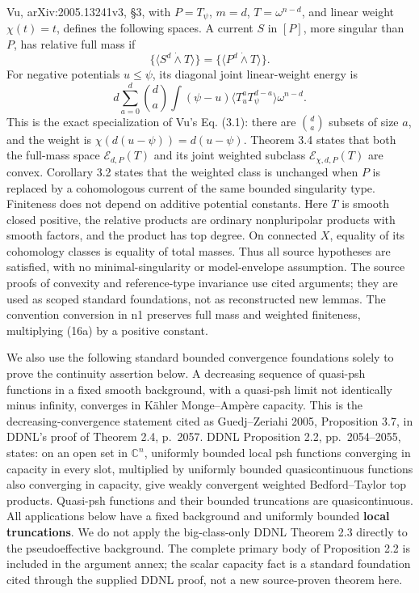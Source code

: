 \documentclass[
  11pt,
]{article}
\begin{document}
Vu, arXiv:2005.13241v3, §3, with \(P=T_\psi\), \(m=d\),
\(T=\omega^{n-d}\), and linear weight \(\chi(t)=t\), defines the
following spaces. A current \(S\) in \([P]\), more singular than \(P\),
has relative full mass if \[
\{\langle S^d\dot\wedge T\rangle\}=
\{\langle P^d\dot\wedge T\rangle\}.
\] For negative potentials \(u\leq\psi\), its diagonal joint
linear-weight energy is \[
d\sum_{a=0}^d\binom da\int(\psi-u)
\langle T_u^aT_\psi^{d-a}\rangle\omega^{n-d}.
\tag{16a}
\] This is the exact specialization of Vu's Eq. (3.1): there are
\(\binom da\) subsets of size \(a\), and the weight is
\(\chi(d(u-\psi))=d(u-\psi)\). Theorem 3.4 states that both the
full-mass space \(\mathcal E_{d,P}(T)\) and its joint weighted subclass
\(\mathcal E_{\chi,d,P}(T)\) are convex. Corollary 3.2 states that the
weighted class is unchanged when \(P\) is replaced by a cohomologous
current of the same bounded singularity type. Finiteness does not depend
on additive potential constants. Here \(T\) is smooth closed positive,
the relative products are ordinary nonpluripolar products with smooth
factors, and the product has top degree. On connected \(X\), equality of
its cohomology classes is equality of total masses. Thus all source
hypotheses are satisfied, with no minimal-singularity or model-envelope
assumption. The source proofs of convexity and reference-type invariance
use cited arguments; they are used as scoped standard foundations, not
as reconstructed new lemmas. The convention conversion in n1 preserves
full mass and weighted finiteness, multiplying (16a) by a positive
constant.

We also use the following standard bounded convergence foundations
solely to prove the continuity assertion below. A decreasing sequence of
quasi-psh functions in a fixed smooth background, with a quasi-psh limit
not identically minus infinity, converges in Kähler Monge--Ampère
capacity. This is the decreasing-convergence statement cited as
Guedj--Zeriahi 2005, Proposition 3.7, in DDNL's proof of Theorem 2.4,
p.~2057. DDNL Proposition 2.2, pp.~2054--2055, states: on an open set in
\(\mathbb C^n\), uniformly bounded local psh functions converging in
capacity in every slot, multiplied by uniformly bounded quasicontinuous
functions also converging in capacity, give weakly convergent weighted
Bedford--Taylor top products. Quasi-psh functions and their bounded
truncations are quasicontinuous. All applications below have a fixed
background and uniformly bounded \textbf{local truncations}. We do not
apply the big-class-only DDNL Theorem 2.3 directly to the
pseudoeffective background. The complete primary body of Proposition 2.2
is included in the argument annex; the scalar capacity fact is a
standard foundation cited through the supplied DDNL proof, not a new
source-proven theorem here.
\end{document}
